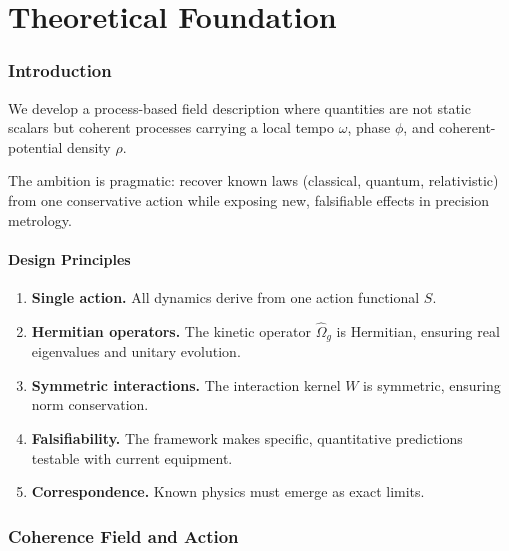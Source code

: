 \documentclass[11pt, a4paper]{article}
\begin{document}
\tableofcontents
\newpage


\part{Theoretical Foundation}

\section{Introduction}

We develop a process-based field description where quantities are not
static scalars but coherent processes carrying a local tempo $\omega$,
phase $\phi$, and coherent-potential density $\rho$.

The ambition is pragmatic: recover known laws (classical, quantum,
relativistic) from one conservative action while exposing new,
falsifiable effects in precision metrology.

\subsection{Design Principles}

\begin{enumerate}[label=\arabic*.]
  \item \textbf{Single action.} All dynamics derive from one action
        functional $S$.
  \item \textbf{Hermitian operators.} The kinetic operator
        $\hat{\Omega}_g$ is Hermitian, ensuring real eigenvalues and
        unitary evolution.
  \item \textbf{Symmetric interactions.} The interaction kernel $W$ is
        symmetric, ensuring norm conservation.
  \item \textbf{Falsifiability.} The framework makes specific,
        quantitative predictions testable with current equipment.
  \item \textbf{Correspondence.} Known physics must emerge as exact
        limits.
\end{enumerate}

\section{Coherence Field and Action}
\end{document}
